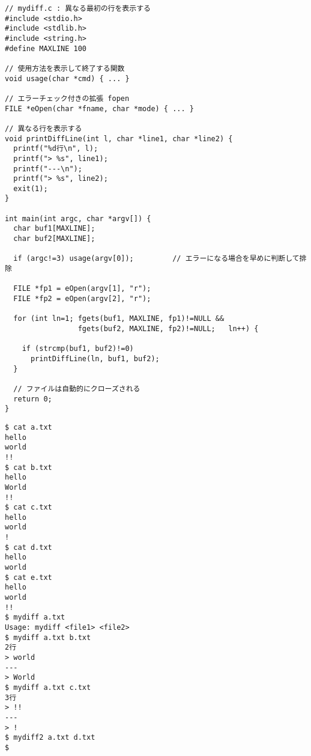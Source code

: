 \documentclass[a4j,dvipdfmx]{jarticle}
\begin{document}
\newpage

%
\begin{lstlisting}[caption=mydiff の解答例（その１）]
// mydiff.c : 異なる最初の行を表示する
#include <stdio.h>
#include <stdlib.h>
#include <string.h>
#define MAXLINE 100

// 使用方法を表示して終了する関数
void usage(char *cmd) { ... }

// エラーチェック付きの拡張 fopen
FILE *eOpen(char *fname, char *mode) { ... }

// 異なる行を表示する
void printDiffLine(int l, char *line1, char *line2) {
  printf("%d行\n", l);
  printf("> %s", line1);
  printf("---\n");
  printf("> %s", line2);
  exit(1);
}

int main(int argc, char *argv[]) {
  char buf1[MAXLINE];
  char buf2[MAXLINE];

  if (argc!=3) usage(argv[0]);         // エラーになる場合を早めに判断して排除

  FILE *fp1 = eOpen(argv[1], "r");
  FILE *fp2 = eOpen(argv[2], "r");

  for (int ln=1; fgets(buf1, MAXLINE, fp1)!=NULL && 
                 fgets(buf2, MAXLINE, fp2)!=NULL;   ln++) {

    if (strcmp(buf1, buf2)!=0)
      printDiffLine(ln, buf1, buf2);
  }

  // ファイルは自動的にクローズされる
  return 0;
}
\end{lstlisting}


\begin{multicols}{2}
\begin{lstlisting}[caption=実行例]
$ cat a.txt
hello
world
!!
$ cat b.txt
hello
World
!!
$ cat c.txt
hello
world
!
$ cat d.txt
hello
world
$ cat e.txt
hello
world
!!
$ mydiff a.txt
Usage: mydiff <file1> <file2>
$ mydiff a.txt b.txt
2行
> world
---
> World
$ mydiff a.txt c.txt
3行
> !!
---
> !
$ mydiff2 a.txt d.txt
$
\end{lstlisting}
\end{multicols}

\newpage
\end{document}
